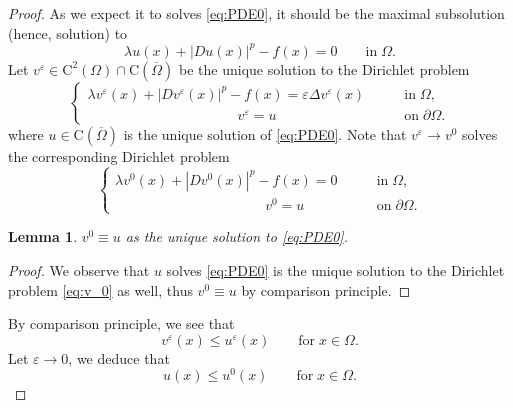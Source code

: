 \documentclass[11pt,reqno]{amsart}
\numberwithin{figure}{section}
\theoremstyle{plain}
\newtheorem{lem}[thm]{Lemma}
\theoremstyle{remark}
\numberwithin{equation}{section}
\newcommand{\rmC}{\mathrm{C}}
\begin{document}
\begin{proof}
As we expect it to solves \eqref{eq:PDE0}, it should be the maximal subsolution (hence, solution) to 
\begin{equation}\label{eq:S_lambda}
    \lambda u(x) + |Du(x)|^p - f(x) = 0 \qquad\text{in}\;\Omega.
\end{equation}
Let $v^\varepsilon\in \rmC^2(\Omega)\cap \rmC(\overline{\Omega})$ be the unique solution to the Dirichlet problem
\begin{equation}\label{eq:v_eps}
\begin{cases}
    \lambda v^\varepsilon(x) + |Dv^\varepsilon(x)|^p - f(x) = \varepsilon \Delta v^\varepsilon(x) &\qquad\text{in}\;\Omega,\\
    \;\;\,\quad\quad\qquad\qquad\qquad\qquad v^\varepsilon = u &\qquad \text{on}\;\partial\Omega.
\end{cases}
\end{equation}
where $u\in \rmC(\overline{\Omega})$ is the unique solution of \eqref{eq:PDE0}. Note that $v^\varepsilon\rightarrow v^0$ solves the corresponding Dirichlet problem
\begin{equation}\label{eq:v_0}
\begin{cases}
    \lambda v^0(x) + |Dv^0(x)|^p - f(x) = 0 &\qquad\text{in}\;\Omega,\\
    \;\;\,\quad\quad\qquad\qquad\qquad\qquad v^0 = u &\qquad \text{on}\;\partial\Omega.
\end{cases}
\end{equation}
\begin{lem} $v^0\equiv u$ as the unique solution to \eqref{eq:PDE0}.
\end{lem}
\begin{proof} We observe that $u$ solves \eqref{eq:PDE0} is the unique solution to the Dirichlet problem \eqref{eq:v_0} as well, thus $v^0 \equiv u$ by comparison principle.
\end{proof}
\noindent By comparison principle, we see that
\begin{equation*}
    v^\varepsilon(x)\leq u^\varepsilon(x) \qquad\text{for}\;x\in \Omega.
\end{equation*}
Let $\varepsilon\to 0$, we deduce that
\begin{equation*}
    u(x)\leq u^0(x) \qquad\text{for}\;x\in \Omega.
\end{equation*}
\end{proof}
\color{black}
\end{document}
